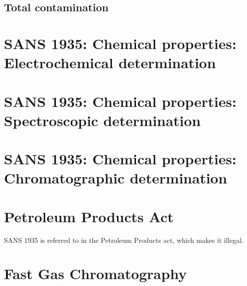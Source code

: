 \subsection{Total contamination}

\section{SANS 1935: Chemical properties: Electrochemical determination}

\section{SANS 1935: Chemical properties: Spectroscopic determination}

\section{SANS 1935: Chemical properties: Chromatographic determination}

\section{Petroleum Products Act}

SANS 1935 is referred to in the Petroleum Products act, which makes it illegal. 

\section{Fast Gas Chromatography}

